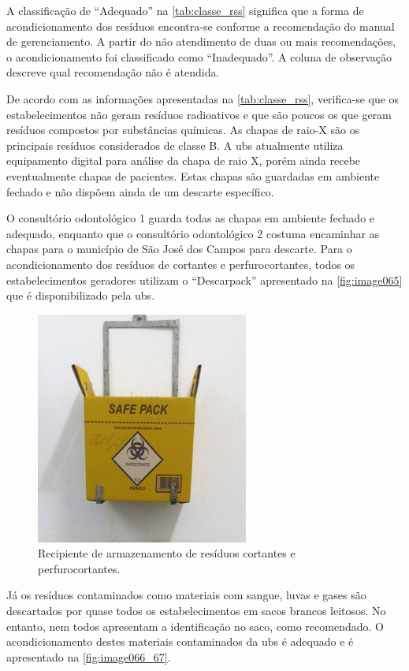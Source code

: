 A classificação de “Adequado” na \autoref{tab:classe_rss} significa que a forma de acondicionamento dos resíduos encontra-se conforme a recomendação do manual de gerenciamento. A partir do não atendimento de duas ou mais recomendações, o acondicionamento foi classificado como “Inadequado”. A coluna de observação descreve qual recomendação não é atendida.



De acordo com as informações apresentadas na \autoref{tab:classe_rss}, verifica-se que os estabelecimentos não geram resíduos radioativos e que são poucos os que geram resíduos compostos por substâncias químicas. As chapas de raio-X são os principais resíduos considerados de classe B. A \gls{ubs} atualmente utiliza equipamento digital para análise da chapa de raio X, porém ainda recebe eventualmente chapas de pacientes. Estas chapas são guardadas em ambiente fechado e não dispõem ainda de um descarte específico.

O consultório odontológico 1 guarda todas as chapas em ambiente fechado e adequado, enquanto que o consultório odontológico 2 costuma encaminhar as chapas para o município de São José dos Campos para descarte.
Para o acondicionamento dos resíduos de cortantes e perfurocortantes, todos os estabelecimentos geradores utilizam o “Descarpack” apresentado na \autoref{fig:image065} que é disponibilizado pela \gls{ubs}.

\begin{figure}
	\centering
	\includegraphics[width=0.45\linewidth]{produtos/prodtres/image065}
	\caption{Recipiente de armazenamento de resíduos cortantes e perfurocortantes.}
	\label{fig:image065}
\end{figure}


Já os resíduos contaminados como materiais com sangue, luvas e gases são descartados por quase todos os estabelecimentos em sacos brancos leitosos. No entanto, nem todos apresentam a identificação no saco, como recomendado. O acondicionamento destes materiais contaminados da \gls{ubs} é adequado e é apresentado na \autoref{fig:image066_67}.


